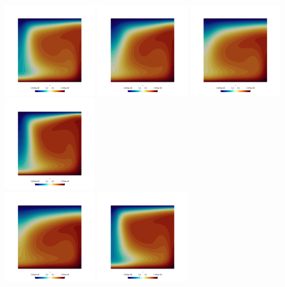 \includegraphics[width=4cm]{python_codes/fieldstone_28/results_case5/T_0040}
\includegraphics[width=4cm]{python_codes/fieldstone_28/results_case5/T_0050}
\includegraphics[width=4cm]{python_codes/fieldstone_28/results_case5/T_0060}
\includegraphics[width=4cm]{python_codes/fieldstone_28/results_case5/T_0070}\\
\includegraphics[width=4cm]{python_codes/fieldstone_28/results_case5/T_0080}
\includegraphics[width=4cm]{python_codes/fieldstone_28/results_case5/T_0090}
